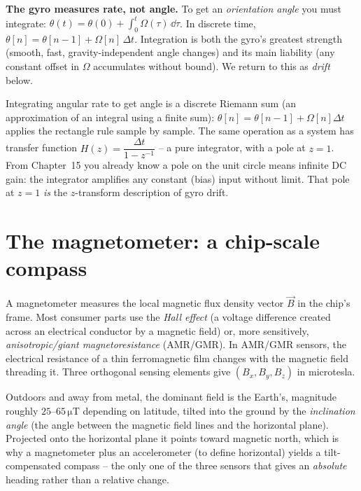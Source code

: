 \begin{focusbox}
\textbf{The gyro measures rate, not angle.} To get an \emph{orientation angle} you must
integrate: $\theta(t) = \theta(0) + \int_0^t \Omega(\tau)\,\dd\tau$. In discrete time,
$\theta[n] = \theta[n-1] + \Omega[n]\,\Delta t$. Integration is both the gyro's
greatest strength (smooth, fast, gravity-independent angle changes) and its main liability (any
constant offset in $\Omega$ accumulates without bound). We return to this as
\emph{drift} below.
\end{focusbox}

\begin{connectionbox}
Integrating angular rate to get angle is a discrete Riemann sum (an approximation of an integral using a finite sum):
$\theta[n]=\theta[n-1]+\Omega[n]\Delta t$ applies the rectangle rule
sample by sample. The same operation as a system has transfer function
$H(z) = \dfrac{\Delta t}{1-z^{-1}}$ -- a pure integrator, with a pole at $z=1$. From
Chapter~15 you already know a pole on the unit circle means infinite DC gain: the
integrator amplifies any constant (bias) input without limit. That pole at
$z=1$ \emph{is} the $z$-transform description of gyro drift.
\end{connectionbox}

\section{The magnetometer: a chip-scale compass}
\label{ch34:mag}

A magnetometer measures the local magnetic flux density vector $\vec B$ in the chip's
frame. Most consumer parts use the \emph{Hall effect} (a voltage difference created across an electrical conductor by a magnetic field) or, more sensitively, \emph{anisotropic/giant magnetoresistance} (AMR/GMR). In AMR/GMR sensors, the electrical resistance of a thin ferromagnetic film changes with the magnetic field threading it. Three orthogonal
sensing elements give $(B_x,B_y,B_z)$ in microtesla.

Outdoors and away from metal, the dominant field is the Earth's, magnitude roughly
$25$--$65\,\mathrm{\mu T}$ depending on latitude, tilted into the ground by the
\emph{inclination angle} (the angle between the magnetic field lines and the horizontal plane). Projected onto the horizontal plane it points toward magnetic
north, which is why a magnetometer plus an accelerometer (to define horizontal) yields
a tilt-compensated compass -- the only one of the three sensors that gives an
\emph{absolute} heading rather than a relative change.

